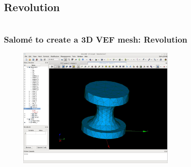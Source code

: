 \documentclass[10pt, hyperref={unicode=true,pdfusetitle, bookmarks=true,bookmarksnumbered=false,bookmarksopen=false, breaklinks=false,pdfborder={0 0 1},backref=true,colorlinks=true,linkcolor=darkblue,pageanchor}]{beamer}
\begin{document}
\subsection{Revolution}
\begin{frame}
\begin{columns}[c] 
\tableofcontents[sections={1-9},currentsection, currentsubsection]
\tableofcontents[sections={10-16},currentsection, currentsubsection]
\end{columns}
\end{frame}
\begin{frame}
\frametitle{Salom\'e to create a 3D VEF mesh: Revolution}

\begin{figure}
\includegraphics[width=0.7\textwidth]{PICTURES/salome9.jpg}
\end{figure}

\end{frame}
\end{document}
